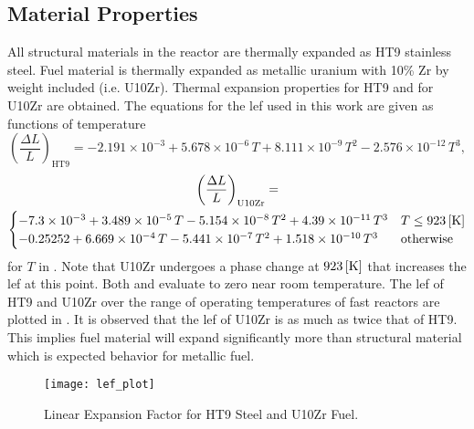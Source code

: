   \subsection{Material Properties}
    \label{sec:model_details__material_properties}
    All structural materials in the reactor are thermally expanded as HT9
    stainless steel. Fuel material is thermally expanded as metallic uranium
    with 10\% Zr by weight included (i.e. U10Zr). Thermal expansion properties
    for HT9 \cite{ht9Prop} and for U10Zr \cite{thexpU10Zr} are obtained. The
    equations for the \gls{lef} used in this work are given as functions of
    temperature
    \begin{equation}
      \label{eq:lef_ht9}
      \left( \frac{\Delta L}{L} \right)_{\text{HT9}} = 
        -2.191 \times 10^{-3} + 5.678 \times 10^{-6} \, T + 
        8.111 \times 10^{-9} \, T^2 - 2.576 \times 10^{-12} \, T^3 ,
    \end{equation}
    \begin{multline}
      \label{eq:lef_u10zr}
      \left( \frac{\Delta L}{L} \right)_{\text{U10Zr}} = \\
        \begin{cases}
          -7.3 \times 10^{-3} + 3.489 \times 10^{-5} \, T 
            - 5.154 \times 10^{-8} \, T^2 + 4.39 \times 10^{-11} \, T^3 & 
            T \le 923 \left[\text{{K}}\right] \\
          -0.25252 + 6.669 \times 10^{-4} \, T - 5.441 \times 10^{-7} \, T^2 
            + 1.518 \times 10^{-10} \, T^3 & \text{otherwise}
        \end{cases}
    \end{multline}
    for $T$ in . Note that U10Zr undergoes a phase change at 
    $923 \left[\text{{K}}\right]$ that increases the \gls{lef} at this point. Both 
     and  evaluate to zero near room
    temperature. The \gls{lef} of HT9 and U10Zr over the range of operating 
    temperatures of fast reactors are plotted in . It is
    observed that the \gls{lef} of U10Zr is as much as twice that of HT9. This 
    implies fuel material will expand significantly more than structural 
    material which is expected behavior for metallic fuel.

    \begin{figure}
      \centering
      \texttt{[image: lef\_plot]}
      \caption{Linear Expansion Factor for HT9 Steel and U10Zr Fuel.}
      \label{fig:lef_plot}
    \end{figure}
    
